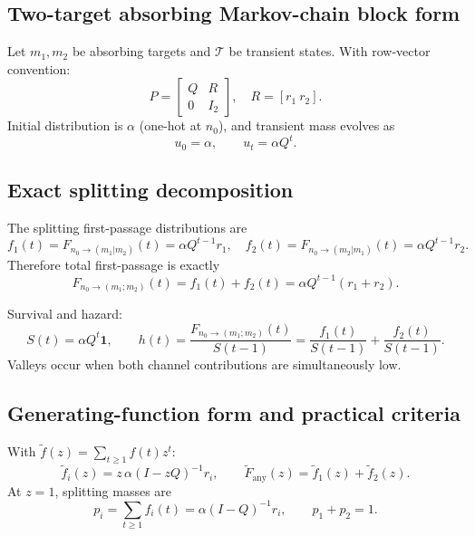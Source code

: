 \documentclass[11pt]{article}
\begin{document}
\subsection{Two-target absorbing Markov-chain block form}
Let $m_1,m_2$ be absorbing targets and $\mathcal T$ be transient states. With row-vector convention:
\begin{equation}
P=
\begin{bmatrix}
Q & R\\
0 & I_2
\end{bmatrix},\quad
R=[r_1\ r_2].
\end{equation}
Initial distribution is $\alpha$ (one-hot at $n_0$), and transient mass evolves as
\begin{equation}
u_0=\alpha,\qquad u_t=\alpha Q^t.
\end{equation}

\subsection{Exact splitting decomposition}
The splitting first-passage distributions are
\begin{equation}
f_1(t)=F_{n_0\to(m_1|m_2)}(t)=\alpha Q^{t-1}r_1,\quad
f_2(t)=F_{n_0\to(m_2|m_1)}(t)=\alpha Q^{t-1}r_2.
\end{equation}
Therefore total first-passage is exactly
\begin{equation}
F_{n_0\to(m_1;m_2)}(t)=f_1(t)+f_2(t)=\alpha Q^{t-1}(r_1+r_2).
\label{eq:split-sum-en}
\end{equation}

Survival and hazard:
\begin{equation}
S(t)=\alpha Q^t\mathbf 1,\qquad
h(t)=\frac{F_{n_0\to(m_1;m_2)}(t)}{S(t-1)}=\frac{f_1(t)}{S(t-1)}+\frac{f_2(t)}{S(t-1)}.
\end{equation}
Valleys occur when both channel contributions are simultaneously low.

\subsection{Generating-function form and practical criteria}
With $\tilde f(z)=\sum_{t\ge1}f(t)z^t$:
\begin{equation}
\tilde f_i(z)=z\,\alpha(I-zQ)^{-1}r_i,\qquad
\tilde F_{\mathrm{any}}(z)=\tilde f_1(z)+\tilde f_2(z).
\end{equation}
At $z=1$, splitting masses are
\begin{equation}
p_i=\sum_{t\ge1}f_i(t)=\alpha(I-Q)^{-1}r_i,\qquad p_1+p_2=1.
\end{equation}
\end{document}
